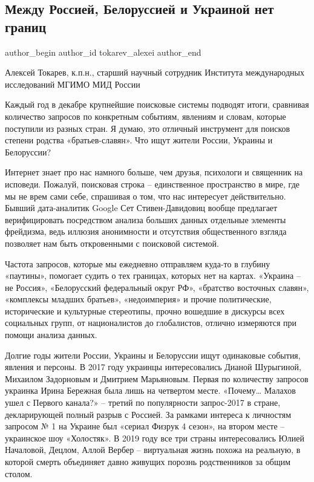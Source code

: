  
 
 
 
 
 
\subsection{Между Россией, Белоруссией и Украиной нет границ}
\label{sec:26_12_2020.news.ru.vz.tokarev_alexei.1.granicy_russia_ukraina_belarus}
\ifcmt
  author_begin
   author_id tokarev_alexei
  author_end
\fi

Алексей Токарев, к.п.н., старший научный сотрудник Института международных исследований МГИМО МИД России

Каждый год в декабре крупнейшие поисковые системы подводят итоги, сравнивая
количество запросов по конкретным событиям, явлениям и словам, которые
поступили из разных стран. Я думаю, это отличный инструмент для поисков степени
родства «братьев-славян». Что ищут жители России, Украины и Белоруссии?

Интернет знает про нас намного больше, чем друзья, психологи и священник на
исповеди. Пожалуй, поисковая строка – единственное пространство в мире, где мы
не врем сами себе, спрашивая о том, что нас интересует действительно. Бывший
дата-аналитик Google Сет Стивен-Давидовиц вообще предлагает верифицировать
посредством анализа больших данных отдельные элементы фрейдизма, ведь иллюзия
анонимности и отсутствия общественного взгляда позволяет нам быть откровенными
с поисковой системой.

Частота запросов, которые мы ежедневно отправляем куда-то в глубину «паутины»,
помогает судить о тех границах, которых нет на картах. «Украина – не Россия»,
«Белорусский федеральный округ РФ», «братство восточных славян», «комплексы
младших братьев», «недоимперия» и прочие политические, исторические и
культурные стереотипы, прочно вошедшие в дискурсы всех социальных групп, от
националистов до глобалистов, отлично измеряются при помощи анализа данных. 

Долгие годы жители России, Украины и Белоруссии ищут одинаковые события,
явления и персоны. В 2017 году украинцы интересовались Дианой Шурыгиной,
Михаилом Задорновым и Дмитрием Марьяновым. Первая по количеству запросов
украинка Ирина Бережная была лишь на четвертом месте. «Почему… Малахов ушел с
Первого канала?» – третий по популярности запрос-2017 в стране, декларирующей
полный разрыв с Россией. За рамками интереса к личностям запросом № 1 на
Украине был «сериал Физрук 4 сезон», на втором месте – украинское шоу
«Холостяк». В 2019 году все три страны интересовались Юлией Началовой, Децлом,
Аллой Вербер – виртуальная жизнь похожа на реальную, в которой смерть
объединяет давно живущих порознь родственников за общим столом.

